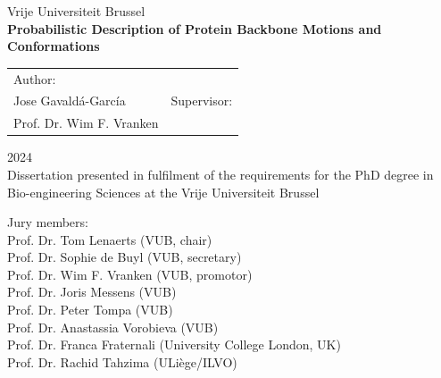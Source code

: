 \documentclass[b5paper, 12pt]{book}
\begin{document}
\frontmatter

\begin{titlepage}
    \centering

    {\LARGE Vrije Universiteit Brussel}\\
    \vspace{1cm}
    \textbf{\LARGE Probabilistic Description of Protein Backbone Motions and Conformations}

    \vspace{1cm}

    \begin{tabular}{p{} p{}}
        \centering Author:\\Jose Gavaldá-García &
        \centering Supervisor:\\Prof. Dr. Wim F. Vranken \\
    \end{tabular}



    \large{2024}\\[1cm]
    \normalsize{Dissertation presented in fulfilment of the requirements for the PhD degree in Bio-engineering Sciences at the Vrije Universiteit Brussel}

    \vspace{1cm}

    \normalsize{Jury members:\\
Prof. Dr. Tom Lenaerts (VUB, chair)\\
Prof. Dr. Sophie de Buyl (VUB, secretary)\\
Prof. Dr. Wim F. Vranken (VUB, promotor)\\
Prof. Dr. Joris Messens (VUB)\\
Prof. Dr. Peter Tompa (VUB)\\
Prof. Dr. Anastassia Vorobieva (VUB)\\
Prof. Dr. Franca Fraternali (University College London, UK)\\
Prof. Dr. Rachid Tahzima (ULiège/ILVO)}

    \vfill %


\end{titlepage}
\end{document}
